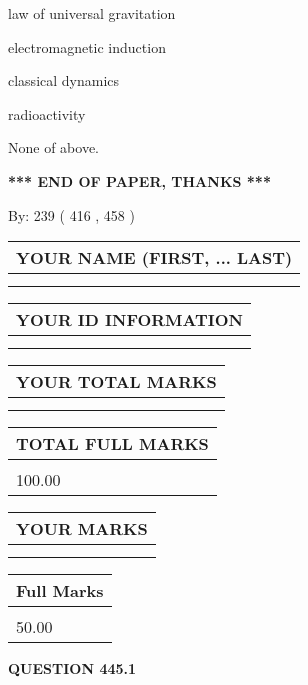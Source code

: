 \documentclass[12pt]{article}
\begin{document}
 
law of universal gravitation
 
 
electromagnetic induction
 
 
classical dynamics
 
 
radioactivity
 
 
 None of above.
 
 
   
   
\vspace{1.0in} 
{\textbf{\large{ *** END OF PAPER, THANKS *** }}} 
   
   
\hspace{1.0in} By: 
 239 ( 416 ,  458 )
   
   
   
   
\newpage 
\setcounter{page}{ 
   445001 } 
   
   
   
   
\noindent\begin{tabular}{|l|}
\hline
YOUR NAME (FIRST, ... LAST)  \\
\hline
 \\ 
 \\ 
\hline
\end{tabular}
\hspace{0.05in} \begin{tabular}{|l|}
\hline
 YOUR   ID   INFORMATION  \\
\hline
 \\ 
 \\ 
\hline
\end{tabular}
   
   
\vspace{0.2in}\noindent\begin{tabular}{|l|}
\hline
YOUR TOTAL MARKS  \\
\hline
 \\ 
 \\ 
\hline
\end{tabular}
\hspace{0.05in} \begin{tabular}{|l|}
\hline
TOTAL FULL MARKS  \\
\hline
 \\ 
100.00 \\
\hline
\end{tabular}
  
\vspace{0.2in}
  
\noindent\begin{tabular}{|l|}
\hline
 YOUR MARKS  \\
\hline
 \\ 
 \\ 
\hline
\end{tabular}
\hspace{0.05in} \begin{tabular}{|l|}
\hline
 Full Marks  \\
\hline
 \\ 
50.00 \\
\hline
\end{tabular}
{\textbf{\Large{QUESTION
445.1 
}}}
  
\end{document}
